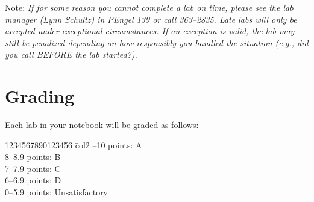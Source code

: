 
Note: {\em %
If for some reason you
cannot complete a lab on time, please see the lab manager (Lynn Schultz) in PEngel 139 or call
363--2835. Late labs will only be accepted under exceptional circumstances.
If an exception is valid, the lab may still be penalized depending on how
responsibly you handled the situation (e.g., did you call BEFORE the lab 
started?).}

\section*{Grading}

Each lab in your notebook will be graded as follows: 
\begin{tabbing}
1234567890123456 \= col2 --10 points: \> A \\
8--8.9 points: \> B \\
7--7.9 points: \> C \\
6--6.9 points: \> D \\
0--5.9 points: \> Unsatisfactory \\
\end{tabbing}


\newpage
\vspace*{\fill}
\newpage
\vspace*{\fill}
\clearpage

